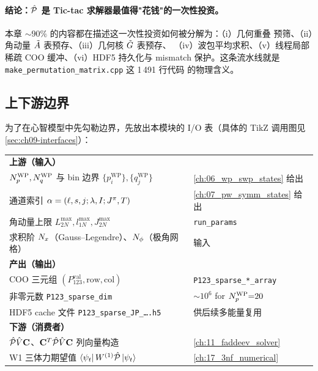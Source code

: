 \paragraph{结论：\(\hat{\mathcal{P}}\) 是 Tic-tac 求解器最值得"花钱"的一次性投资。}
本章 \(\sim 90\%\) 的内容都在描述这一次性投资如何被分解为：（i）几何重叠
预筛、（ii）角动量 \(\tilde{A}\) 表预存、（iii）几何核 \(\tilde{G}\) 表预存、
（iv）波包平均求积、（v）线程局部稀疏 COO 缓冲、（vi）HDF5 持久化与 mismatch
保护。这条流水线就是 \texttt{make\_permutation\_matrix.cpp} 这 1\,491 行代码
的物理含义。

\subsection{上下游边界}
\label{subsec:ch09-up-down-stream}

为了在心智模型中先勾勒边界，先放出本模块的 I/O 表（具体的 TikZ 调用图见
\cref{sec:ch09-interfaces}）：

\begin{center}
\renewcommand{\arraystretch}{1.18}
\begin{tabular}{ll}
\toprule
\textbf{上游（输入）} & \\
\({N_{p}^{\text{WP}}}, {N_{q}^{\text{WP}}}\) 与 bin 边界 \(\{p^{\text{WP}}_i\},\{q^{\text{WP}}_j\}\)
   & \cref{ch:06_wp_swp_states} 给出 \\
通道索引 \(\alpha=(\ell, s, j; \lambda, I; J^\pi, T)\)
   & \cref{ch:07_pw_symm_states} 给出 \\
角动量上限 \(L_{2N}^{\max}, l_{1N}^{\max}, J_{2N}^{\max}\)
   & \texttt{run\_params} \\
求积阶 \(N_{x}\)（Gauss--Legendre）、\(N_{\phi}\)（极角网格）
   & 输入 \\
\midrule
\textbf{产出（输出）} & \\
COO 三元组 \((P_{123}^{\text{val}}, \text{row}, \text{col})\)
   & \texttt{P123\_sparse\_*\_array} \\
非零元数 \texttt{P123\_sparse\_dim} & \(\sim 10^{6}\) for \({N_{p}^{\text{WP}}}{=}20\) \\
HDF5 cache 文件 \texttt{P123\_sparse\_JP\_\dots.h5} & 供后续多能量复用 \\
\midrule
\textbf{下游（消费者）} & \\
\(\hat{\mathcal{P}}\hat{V}\mathbf{C}\)、\(\mathbf{C}^T\hat{\mathcal{P}}\hat{V}\mathbf{C}\) 列向量构造
   & \cref{ch:11_faddeev_solver} \\
W1 三体力期望值 \(\bra{\psi_t}W^{(1)}\hat{\mathcal{P}}\ket{\psi_t}\)
   & \cref{ch:17_3nf_numerical} \\
\bottomrule
\end{tabular}
\end{center}

